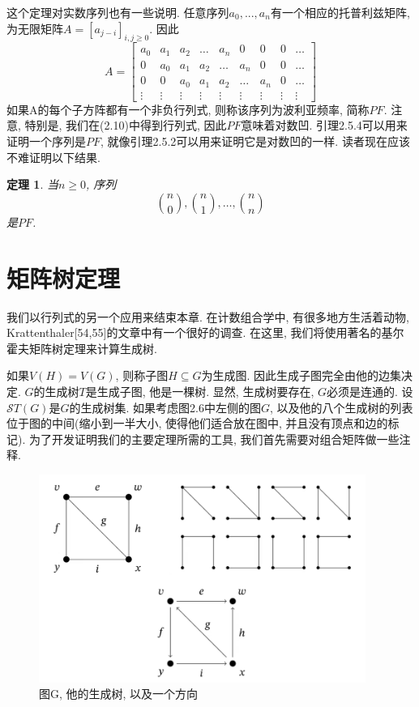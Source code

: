 \documentclass{ctexbook}
\newtheorem{thm}{定理}[section]
\begin{document}
	这个定理对实数序列也有一些说明. 任意序列$a_{0},...,a_{n}$有一个相应的托普利兹矩阵, 为无限矩阵$A=[a_{j-i}]_{i,j\geq 0}$. 因此
\[
	A=\left[\begin{array}{ccccccccc}
		a_{0} & a_{1} & a_{2} & \ldots & a_{n} & 0 & 0 & 0 & \ldots \\
		0 & a_{0} & a_{1} & a_{2} & \ldots & a_{n} & 0 & 0 & \ldots \\
		0 & 0 & a_{0} & a_{1} & a_{2} & \ldots & a_{n} & 0 & \ldots \\
		\vdots & \vdots & \vdots & \vdots & \vdots & \vdots & \vdots & \vdots & \vdots
	\end{array}\right]
\]
	如果A的每个子方阵都有一个非负行列式, 则称该序列为波利亚频率, 简称$PF$. 注意, 特别是, 我们在(2.10)中得到行列式, 因此$PF$意味着对数凹. 引理2.5.4可以用来证明一个序列是$PF$, 就像引理2.5.2可以用来证明它是对数凹的一样. 读者现在应该不难证明以下结果.
\begin{thm}
	当$n\geq 0$, 序列
	\[
	\binom{n}{0},\binom{n}{1},\ldots,\binom{n}{n}
	\]
	是$PF$.
\end{thm}

\section{矩阵树定理}
	我们以行列式的另一个应用来结束本章. 在计数组合学中, 有很多地方生活着动物, Krattenthaler[54,55]的文章中有一个很好的调查. 在这里, 我们将使用著名的基尔霍夫矩阵树定理来计算生成树.

	如果$V(H)=V(G)$, 则称子图$H\subseteq G$为生成图. 因此生成子图完全由他的边集决定. $G$的生成树$T$是生成子图, 他是一棵树. 显然, 生成树要存在, $G$必须是连通的. 设$\mathcal{S}T(G)$是$G$的生成树集. 如果考虑图2.6中左侧的图$G$, 以及他的八个生成树的列表位于图的中间(缩小到一半大小, 使得他们适合放在图中, 并且没有顶点和边的标记). 为了开发证明我们的主要定理所需的工具, 我们首先需要对组合矩阵做一些注释.
\begin{figure}[htbp]
	\centering
	\includegraphics*[width=0.95\textwidth]{./fig2/6.jpg}
	\caption{ 图G, 他的生成树, 以及一个方向}
\end{figure}
\end{document}
